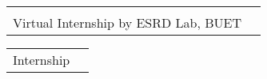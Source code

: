 \documentclass[]{awesome-cv}
\begin{document}
\vspace{-7mm}


\begin{cventries}
	\cventry
	{\def\arraystretch{1.15}{\begin{tabular}{ l l }
				   & {\skill{ }} \\
			    Virtual Internship by ESRD Lab, BUET  & {\skill{ }} \\
	\end{tabular}}}
	{\def\arraystretch{1.15}{\begin{tabular}{ l l }
				Internship  & {\skill{ }} \\
	\end{tabular}}}
	{}
	{}
	{}
\end{cventries}

\vspace{-7mm}
\end{document}
